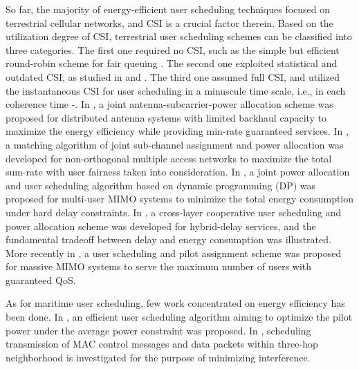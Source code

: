 \documentclass[conference]{IEEEtran}
\begin{document}
So far, the majority of energy-efficient user scheduling techniques focused on terrestrial cellular networks, and CSI is a crucial factor therein.  
Based on the utilization degree of CSI, terrestrial user scheduling schemes can be classified into three categories. The first one required no CSI, such as the simple but efficient round-robin scheme for fair queuing \cite{p51}. The second one exploited statistical and outdated CSI, as studied in \cite{p52} and \cite{p53}. The third one assumed full CSI, and utilized the instantaneous CSI for user scheduling in a minuscule time scale, i.e., in each coherence time \cite{p3}-\cite{p7}. 
In \cite{p3}, a joint antenna-subcarrier-power allocation scheme was proposed for distributed antenna systems with limited backhaul capacity to maximize the energy efficiency while providing min-rate guaranteed services. In \cite{p6}, a matching algorithm of joint sub-channel assignment and power allocation was developed for non-orthogonal multiple access networks to maximize the total sum-rate with user fairness taken into consideration. In \cite{p4}, a joint power allocation and user scheduling algorithm based on dynamic programming (DP) was proposed for multi-user MIMO systems to minimize the total energy consumption under hard delay constraints. In \cite{p5}, a cross-layer cooperative user scheduling and power allocation scheme was developed for hybrid-delay services, and the fundamental tradeoff between delay and energy consumption was illustrated. More recently in \cite{p7}, a user scheduling and pilot assignment scheme was proposed for massive MIMO systems to serve the maximum number of users with guaranteed QoS.

As for maritime user scheduling, few work concentrated on energy efficiency has been done. In \cite{p400}, 
an efficient user scheduling algorithm aiming to optimize the pilot power under the average power constraint was proposed. 
In \cite{p401}, 
scheduling transmission of MAC control messages and data packets within three-hop neighborhood is investigated for the purpose of minimizing interference. 
\end{document}
